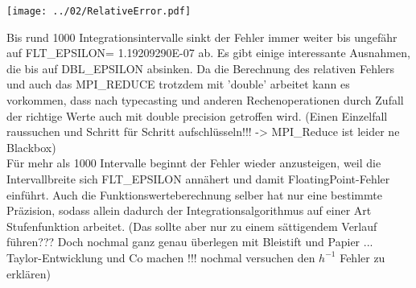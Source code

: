 \documentclass[12pt,a4paper]{article}
\begin{document}
\begin{center}
	\captionsetup{type=figure}
	\centering
	\begin{minipage}{0.7\linewidth}
		\texttt{[image: ../02/RelativeError.pdf]}
	\end{minipage}
	\label{fig:RelativeError}
\end{center}

Bis rund 1000 Integrationsintervalle sinkt der Fehler immer weiter bis ungefähr auf FLT\_EPSILON= 1.19209290E-07 ab. Es gibt einige interessante Ausnahmen, die bis auf DBL\_EPSILON absinken. Da die Berechnung des relativen Fehlers und auch das MPI\_REDUCE trotzdem mit 'double' arbeitet kann es vorkommen, dass nach typecasting und anderen Rechenoperationen durch Zufall der richtige Werte auch mit double precision getroffen wird. (Einen Einzelfall raussuchen und Schritt für Schritt aufschlüsseln!!! -> MPI\_Reduce ist leider ne Blackbox)\\
Für mehr als 1000 Intervalle beginnt der Fehler wieder anzusteigen, weil die Intervallbreite sich FLT\_EPSILON annähert und damit FloatingPoint-Fehler einführt. Auch die Funktionswerteberechnung selber hat nur eine bestimmte Präzision, sodass allein dadurch der Integrationsalgorithmus auf einer Art Stufenfunktion arbeitet. (Das sollte aber nur zu einem sättigendem Verlauf führen??? Doch nochmal ganz genau überlegen mit Bleistift und Papier ... Taylor-Entwicklung und Co machen !!! nochmal versuchen den $h^{-1}$ Fehler zu erklären)\\

\end{document}
